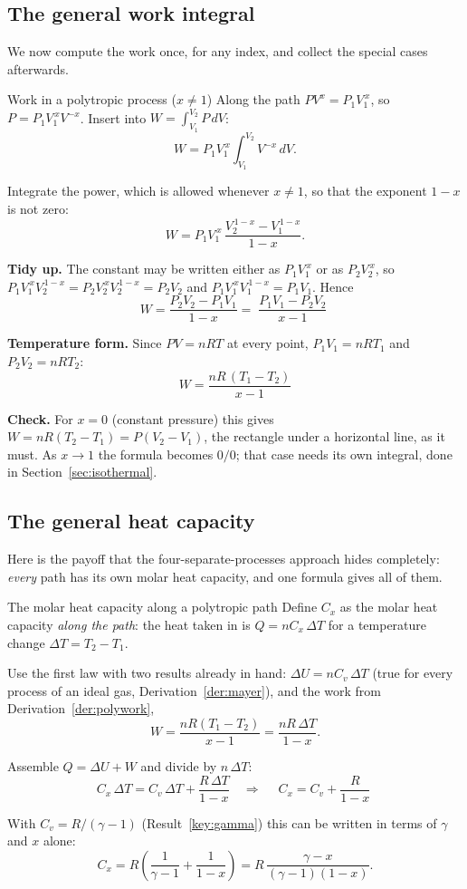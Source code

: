 \subsection{The general work integral}

We now compute the work once, for any index, and collect the special cases afterwards.

\begin{derivbox}{Work in a polytropic process (\texorpdfstring{$x\neq1$}{x not 1})}\label{der:polywork}
 Along the path $PV^x=P_1V_1^{\,x}$, so $P=P_1V_1^{\,x}V^{-x}$. Insert into
$W=\int_{V_1}^{V_2}P\,dV$:
\[ W=P_1V_1^{\,x}\int_{V_1}^{V_2}V^{-x}\,dV . \]

 Integrate the power, which is allowed whenever $x\neq1$, so that the exponent $1-x$ is not zero:
\[ W=P_1V_1^{\,x}\,\frac{V_2^{\,1-x}-V_1^{\,1-x}}{1-x} . \]

 \textbf{Tidy up.} The constant may be written either as $P_1V_1^{\,x}$ or as $P_2V_2^{\,x}$, so
$P_1V_1^{\,x}V_2^{\,1-x}=P_2V_2^{\,x}V_2^{\,1-x}=P_2V_2$ and $P_1V_1^{\,x}V_1^{\,1-x}=P_1V_1$. Hence
\[ W=\frac{P_2V_2-P_1V_1}{1-x}=\boxed{\;\frac{P_1V_1-P_2V_2}{\,x-1\,}\;} \]

 \textbf{Temperature form.} Since $PV=nRT$ at every point, $P_1V_1=nRT_1$ and $P_2V_2=nRT_2$:
\[ \boxed{\;W=\frac{nR\,(T_1-T_2)}{\,x-1\,}\;} \]

 \textbf{Check.} For $x=0$ (constant pressure) this gives $W=nR(T_2-T_1)=P(V_2-V_1)$, the
rectangle under a horizontal line, as it must. As $x\to1$ the formula becomes $0/0$; that case needs its
own integral, done in Section~\ref{sec:isothermal}.
\end{derivbox}

\subsection{The general heat capacity}

Here is the payoff that the four-separate-processes approach hides completely: \emph{every} path has its
own molar heat capacity, and one formula gives all of them.

\begin{derivbox}{The molar heat capacity along a polytropic path}\label{der:polyC}
 Define $C_x$ as the molar heat capacity \emph{along the path}: the heat taken in is
$Q=nC_x\,\Delta T$ for a temperature change $\Delta T=T_2-T_1$.

 Use the first law with two results already in hand: $\Delta U=nC_v\,\Delta T$ (true for every
process of an ideal gas, Derivation~\ref{der:mayer}), and the work from Derivation~\ref{der:polywork},
\[
W=\frac{nR(T_1-T_2)}{x-1}=\frac{nR\,\Delta T}{1-x}.
\]

 Assemble $Q=\Delta U+W$ and divide by $n\,\Delta T$:
\[
C_x\,\Delta T=C_v\,\Delta T+\frac{R\,\Delta T}{1-x}
\quad\Longrightarrow\quad
\boxed{\;C_x=C_v+\frac{R}{1-x}\;}
\]

 With $C_v=R/(\gamma-1)$ (Result~\ref{key:gamma}) this can be written in terms of $\gamma$ and $x$
alone:
\[
C_x=R\left(\frac{1}{\gamma-1}+\frac{1}{1-x}\right)=R\,\frac{\gamma-x}{(\gamma-1)(1-x)} .
\]
\end{derivbox}

